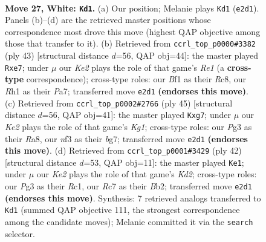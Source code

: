 \documentclass[11pt]{article}
\begin{document}
\clearpage

\begin{figure}[p]\centering
\begin{subfigure}{0.46\textwidth}\centering
\resizebox{\linewidth}{!}{%
\newchessgame
\chessboard[
  setfen={1r3r2/pbRp1pk1/8/4p2p/8/5nP1/PP2KP1P/2B2B1R w - - 2 27},
  showmover=false,
  pgfstyle=straightmove, color=movearrow, markmove={e2-d1}
]}
\caption{}
\end{subfigure}\hfill
\begin{subfigure}{0.46\textwidth}\centering
\resizebox{\linewidth}{!}{%
\newchessgame
\chessboard[
  setfen={2r1r1k1/p3Bpbp/6p1/4N3/3PP3/8/b4PPP/R4RK1 b - - 2 22},
  showmover=false,
  pgfstyle=straightmove, color=movearrow, markmove={e8-e7}
]}
\caption{}
\end{subfigure}
\\[4pt]
\begin{subfigure}{0.46\textwidth}\centering
\resizebox{\linewidth}{!}{%
\newchessgame
\chessboard[
  setfen={r5k1/4ppB1/6pp/ppr2b2/3N3P/2P5/PP3PP1/R3R1K1 b - - 0 23},
  showmover=false,
  pgfstyle=straightmove, color=movearrow, markmove={g8-g7}
]}
\caption{}
\end{subfigure}\hfill
\begin{subfigure}{0.46\textwidth}\centering
\resizebox{\linewidth}{!}{%
\newchessgame
\chessboard[
  setfen={r2r2k1/1p3ppp/4b3/8/5n2/P3P3/1B1K1PPP/2R2B1R w - - 3 22},
  showmover=false,
  pgfstyle=straightmove, color=movearrow, markmove={d2-e1}
]}
\caption{}
\end{subfigure}
\caption{\textbf{Move 27, White: \texttt{Kd1}.} (a) Our position; Melanie plays \texttt{Kd1} (\texttt{e2d1}). Panels (b)--(d) are the retrieved master positions whose correspondence most drove this move (highest QAP objective among those that transfer to it). (b) Retrieved from \texttt{ccrl\_top\_p0000\#3382} (ply 43) [structural distance $d$=56, QAP obj=44]: the master played \texttt{Rxe7}; under $\mu$ our \emph{Ke2} plays the role of that game's \emph{Re1} (a \textbf{cross-type} correspondence); cross-type roles: our \emph{B}f1 as their \emph{R}c8, our \emph{R}h1 as their \emph{P}a7; transferred move \texttt{e2d1} \textbf{(endorses this move)}. (c) Retrieved from \texttt{ccrl\_top\_p0002\#2766} (ply 45) [structural distance $d$=56, QAP obj=41]: the master played \texttt{Kxg7}; under $\mu$ our \emph{Ke2} plays the role of that game's \emph{Kg1}; cross-type roles: our \emph{P}g3 as their \emph{R}a8, our \emph{n}f3 as their \emph{b}g7; transferred move \texttt{e2d1} \textbf{(endorses this move)}. (d) Retrieved from \texttt{ccrl\_top\_p0001\#3429} (ply 42) [structural distance $d$=53, QAP obj=11]: the master played \texttt{Ke1}; under $\mu$ our \emph{Ke2} plays the role of that game's \emph{Kd2}; cross-type roles: our \emph{P}g3 as their \emph{R}c1, our \emph{R}c7 as their \emph{B}b2; transferred move \texttt{e2d1} \textbf{(endorses this move)}. Synthesis: 7 retrieved analogs transferred to \texttt{Kd1} (summed QAP objective 111, the strongest correspondence among the candidate moves); Melanie committed it via the \texttt{search} selector.}
\label{fig:thought-m52}
\end{figure}
\end{document}
